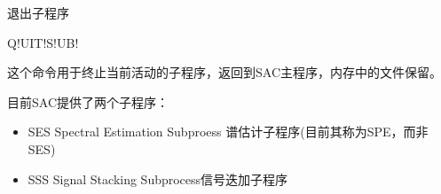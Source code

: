\label{cmd:quitsub}

退出子程序

\begin{SACSTX}
Q!UIT!S!UB!
\end{SACSTX}

这个命令用于终止当前活动的子程序，返回到SAC主程序，内存中的文件保留。

目前SAC提供了两个子程序：
\begin{itemize}
\item SES Spectral Estimation Subproess 谱估计子程序(目前其称为SPE，而非SES)
\item SSS Signal Stacking Subprocess信号迭加子程序
\end{itemize}

